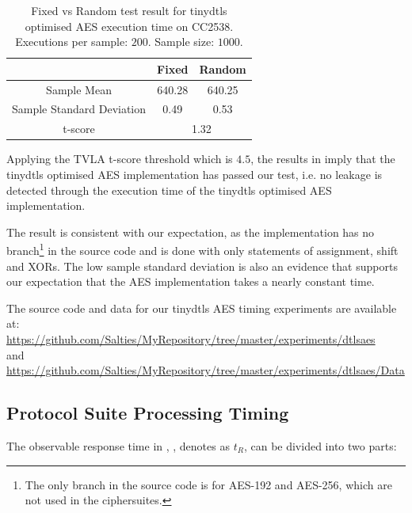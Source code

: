 \begin{table}[ht!]
	\center
	\begin{tabular}{|c|c|c|}
		\hline
		                         & Fixed       & Random      \\ \hline
		Sample Mean              & 640.28      & 640.25      \\ \hline
		Sample Standard Deviation & 0.49        & 0.53        \\ \hline
		t-score                  & \multicolumn{2}{c|}{1.32} \\ \hline
	\end{tabular}
	\caption{Fixed vs Random test result for tinydtls optimised AES execution time on CC2538. Executions per sample: $200$. Sample size: $1000$.}
	\label{Tbl: Fixed vs Random test result for tinydtls AES execution time on CC2538}
\end{table}

Applying the TVLA t-score threshold which is $4.5$, the results in  imply that the tinydtls optimised AES implementation has passed our test, i.e. no leakage is detected through the execution time of the tinydtls optimised AES implementation. 

The result is consistent with our expectation, as the implementation has no branch\footnote{The only branch in the source code is for AES-192 and AES-256, which are not used in the ciphersuites.} in the source code and is done with only statements of assignment, shift and XORs. The low sample standard deviation is also an evidence that supports our expectation that the AES implementation takes a nearly constant time.

The source code and data for our tinydtls AES timing experiments are available at: \\
\url{https://github.com/Salties/MyRepository/tree/master/experiments/dtlsaes} \\
and \\
\url{https://github.com/Salties/MyRepository/tree/master/experiments/dtlsaes/Data}

\subsection{Protocol Suite Processing Timing} \label{Protocol Suite Processing Time}

The observable response time in , , denotes as $t_R$, can be divided into two parts:

